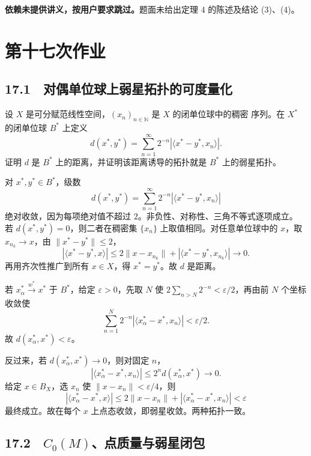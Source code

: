 \textbf{依赖未提供讲义，按用户要求跳过。}题面未给出定理 4 的陈述及结论 (3)、(4)。

\section{第十七次作业}

\subsection*{17.1　对偶单位球上弱星拓扑的可度量化}

\begin{problem}
设 $X$ 是可分赋范线性空间，$(x_n)_{n\in\mathbb N}$ 是 $X$ 的闭单位球中的稠密
序列。在 $X^*$ 的闭单位球 $B^*$ 上定义
\[
 d(x^*,y^*)=\sum_{n=1}^\infty2^{-n}
 |\langle x^*-y^*,x_n\rangle|.
\]
证明 $d$ 是 $B^*$ 上的距离，并证明该距离诱导的拓扑就是 $B^*$ 上的弱星拓扑。
\end{problem}

对 $x^*,y^*\in B^*$，级数
\[
 d(x^*,y^*)=\sum_{n=1}^\infty2^{-n}|\langle x^*-y^*,x_n\rangle|
\]
绝对收敛，因为每项绝对值不超过 $2$。非负性、对称性、三角不等式逐项成立。
若 $d(x^*,y^*)=0$，则二者在稠密集 $\{x_n\}$ 上取值相同。对任意单位球中的
$x$，取 $x_{n_k}\to x$，由 $\|x^*-y^*\|\le2$，
\[
 |\langle x^*-y^*,x\rangle|
 \le2\|x-x_{n_k}\|+|\langle x^*-y^*,x_{n_k}\rangle|\to0.
\]
再用齐次性推广到所有 $x\in X$，得 $x^*=y^*$。故 $d$ 是距离。

若 $x_\alpha^*\overset{w^*}\to x^*$ 于 $B^*$，给定 $\varepsilon>0$，先取 $N$
使 $2\sum_{n>N}2^{-n}<\varepsilon/2$，再由前 $N$ 个坐标收敛使
\[
 \sum_{n=1}^N2^{-n}|\langle x_\alpha^*-x^*,x_n\rangle|<\varepsilon/2.
\]
故 $d(x_\alpha^*,x^*)<\varepsilon$。

反过来，若 $d(x_\alpha^*,x^*)\to0$，则对固定 $n$，
\[
 |\langle x_\alpha^*-x^*,x_n\rangle|\le2^n d(x_\alpha^*,x^*)\to0.
\]
给定 $x\in B_X$，选 $x_n$ 使 $\|x-x_n\|<\varepsilon/4$，则
\[
 |\langle x_\alpha^*-x^*,x\rangle|
 \le2\|x-x_n\|+|\langle x_\alpha^*-x^*,x_n\rangle|<\varepsilon
\]
最终成立。故在每个 $x$ 上点态收敛，即弱星收敛。两种拓扑一致。

\subsection*{17.2　$C_0(M)$、点质量与弱星闭包}

